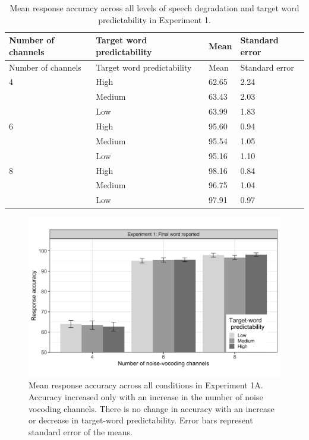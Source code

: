 \documentclass[a4paper, nobind]{templates/ociamthesis}
\begin{document}
\begin{longtable}[]{@{}llll@{}}
\caption{Mean response accuracy across all levels of speech degradation
and target word predictability in Experiment 1.}
\label{summary1a}
\tabularnewline
\toprule
Number of channels & Target word predictability & Mean & Standard
error \\
\midrule
\endfirsthead
\toprule
Number of channels & Target word predictability & Mean & Standard
error \\
\midrule
\endhead
4 & High & 62.65 & 2.24 \\
& Medium & 63.43 & 2.03 \\
& Low & 63.99 & 1.83 \\
6 & High & 95.60 & 0.94 \\
& Medium & 95.54 & 1.05 \\
& Low & 95.16 & 1.10 \\
8 & High & 98.16 & 0.84 \\
& Medium & 96.75 & 1.04 \\
& Low & 97.91 & 0.97 \\
\bottomrule
\end{longtable}

\begin{figure}

{\centering \includegraphics[width=0.95\linewidth]{figures/results-fig/expt-1a} 

}

\caption{Mean response accuracy across all conditions in Experiment 1A. Accuracy increased only with an increase in the number of noise vocoding channels. There is no change in accuracy with an increase or decrease in target-word predictability. Error bars represent standard error of the means.}\label{fig:figure1a}
\end{figure}
\end{document}
